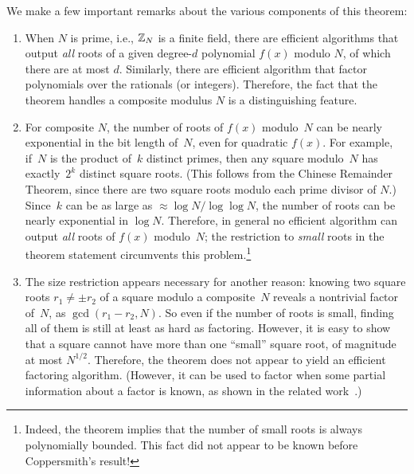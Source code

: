 \documentclass[11pt]{article}
\begin{document}
\noindent We make a few important remarks about the various components
of this theorem:
\begin{enumerate}[itemsep=0pt]
\item When $N$ is prime, i.e., $\mathbb{Z}_{N}$ is a finite field, there are
  efficient algorithms that output \emph{all} roots of a given
  degree-$d$ polynomial $f(x)$ modulo $N$, of which there are at most
  $d$. Similarly, there are efficient algorithm that factor
  polynomials over the rationals (or integers). Therefore, the fact
  that the theorem handles a composite modulus $N$ is a distinguishing
  feature.
\item For composite $N$, the number of roots of $f(x)$ modulo~$N$ can
  be nearly exponential in the bit length of~$N$, even for quadratic
  $f(x)$. For example, if~$N$ is the product of~$k$ distinct primes,
  then any square modulo~$N$ has exactly~$2^{k}$ distinct square
  roots. (This follows from the Chinese Remainder Theorem, since there
  are two square roots modulo each prime divisor of $N$.) Since~$k$
  can be as large as $\approx \log N / \log \log N$, the number of
  roots can be nearly exponential in $\log N$. Therefore, in general
  no efficient algorithm can output \emph{all} roots of $f(x)$
  modulo~$N$; the restriction to \emph{small} roots in the theorem
  statement circumvents this problem.\footnote{Indeed, the theorem
    implies that the number of small roots is always polynomially
    bounded. This fact did not appear to be known before Coppersmith's
    result!}
\item The size restriction appears necessary for another reason:
  knowing two square roots $r_{1} \neq \pm r_{2}$ of a square modulo a
  composite~$N$ reveals a nontrivial factor of~$N$, as
  $\gcd(r_{1}-r_{2}, N)$. So even if the number of roots is small,
  finding all of them is still at least as hard as factoring. However,
  it is easy to show that a square cannot have more than one ``small''
  square root, of magnitude at most $N^{1/2}$. Therefore, the theorem
  does not appear to yield an efficient factoring algorithm. (However,
  it can be used to factor when some partial information about a
  factor is known, as shown in the related
  work~\cite{DBLP:conf/eurocrypt/Coppersmith96a}.)
\end{enumerate}
\end{document}
